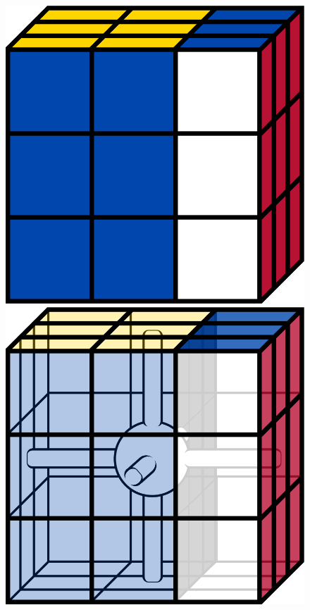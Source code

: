 \documentclass[12pt]{article}
\begin{document}
\begin{figure}[h]
\begin{minipage}[c]{0.2\textwidth}
    \end{minipage}
    \begin{minipage}[c]{0.05\textwidth}
        \centering
    \end{minipage}
    \hspace{0.5cm}
    \begin{minipage}[c]{0.2\textwidth}
        \includegraphics[scale=0.1]{moves/cube_r.png}
    \end{minipage}
    \begin{minipage}[c]{0.2\textwidth}
        \includegraphics[scale=0.1]{moves/core_r_transform.png}

\end{minipage}
\end{figure}
\end{document}

